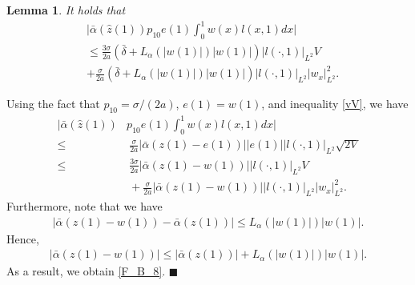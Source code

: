\documentclass[twocolumn]{autart}
\newtheorem{lemm}{Lemma}
\newenvironment{lemma}{\begin{lemm}}{\hfill \end{lemm}}
\newenvironment{proof}{{\it Proof. }}{\hfill $\blacksquare$ }
\begin{document}
\begin{lemma}
It holds that 
\begin{align}
&\bigg|\bar{\alpha}(\hat{z}(1))p_{10}e(1)\int_{0}^{1}w(x)l(x,1)dx\bigg|\nonumber\\
&\leq \frac{3\sigma}{2a} \left(\bar{\delta}+L_{\alpha}(|w(1)|)|w(1)|\right)|l(\cdot,1)|_{L^2}V \nonumber \\
&+\frac{\sigma}{2a} \left(\bar{\delta}+L_{\alpha}(|w(1)|)|w(1)|\right)|l(\cdot,1)|_{L^2}|w_x|_{L^2}^2.\label{F_B_8} 
\end{align}
\hfill  
\end{lemma}
\begin{proof}
Using the fact that $p_{10}=\sigma/(2a)$, $e(1)=w(1)$, and inequality \eqref{vV}, we have 
\begin{align}
\bigg|\bar{\alpha}(\hat{z}(1))&p_{10}e(1)\int_{0}^{1}w(x)l(x,1)dx\bigg| \nonumber\\
\leq&~ \frac{\sigma}{2a} |\bar{\alpha}(z(1)-e(1))||e(1)||l(\cdot,1)|_{L^2}\sqrt{2V} \nonumber\\
\leq&~ \frac{3\sigma}{2a} |\bar{\alpha}(z(1)-w(1))||l(\cdot,1)|_{L^2}V \nonumber \\
&~+\frac{\sigma}{2a} |\bar{\alpha}(z(1)-w(1))||l(\cdot,1)|_{L^2}|w_x|_{L^2}^2.\nonumber 
\end{align}
Furthermore, note that we have 
\begin{align*}
|\bar{\alpha}(z(1)-w(1))-\bar{\alpha}(z(1))|\leq L_{\alpha}(|w(1)|)|w(1)|. 
\end{align*}
Hence, 
\begin{align*}
|\bar{\alpha}(z(1)-w(1))|\leq |\bar{\alpha}(z(1))|+L_{\alpha}(|w(1)|)|w(1)|.
\end{align*}
As a result, we obtain \eqref{F_B_8}. 
\end{proof}
\end{document}
